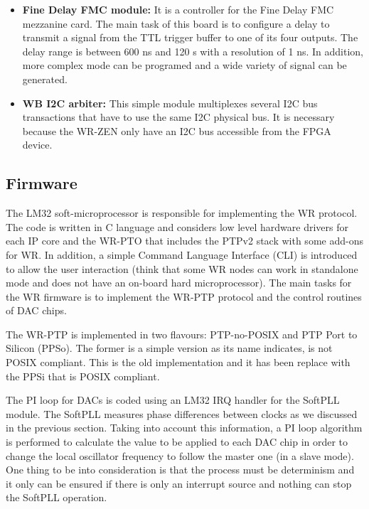 \documentclass[review]{elsarticle}
\newcommand{\klyonenote}[1]{\todo[bordercolor=red, backgroundcolor=yellow, noline]{#1}}
\begin{document}
\begin{itemize}
{	%
	}
	\item{\textbf{Fine Delay FMC module:} It is a controller for the Fine Delay FMC mezzanine card. The main task of this board is to configure a delay to transmit a signal from the TTL trigger buffer to one of its four outputs. The delay range is between 600 ns and 120 s with a resolution of 1 ns. In addition, more complex mode can be programed and a wide variety of signal can be generated.}
	\item{\textbf{WB I2C arbiter:} This simple module multiplexes several I2C bus transactions that have to use the same I2C physical bus. It is necessary because the WR-ZEN only have an I2C bus accessible from the FPGA device.}
\end{itemize}

\subsection{Firmware}

The LM32 soft-microprocessor is responsible for implementing the WR protocol. The code is written in C language and considers low level hardware drivers for each IP core and the WR-PTO that includes the PTPv2 stack with some add-ons for WR. In addition, a simple Command Language Interface (CLI) is introduced to allow the user interaction (think that some WR nodes can work in standalone mode and does not have an on-board hard microprocessor). The main tasks for the WR firmware is to implement the WR-PTP protocol and the control routines of DAC chips. 

\klyonenote{What more information can we add at this point?}
The WR-PTP is implemented in two flavours: PTP-no-POSIX and PTP Port to Silicon (PPSo). The former is a simple version as its name indicates, is not POSIX compliant. This is the old implementation and it has been replace with the PPSi that is POSIX compliant.

The PI loop for DACs is coded using an LM32 IRQ handler for the SoftPLL module. The SoftPLL measures phase differences between clocks as we discussed in the previous section. Taking into account this information, a PI loop algorithm is performed to calculate the value to be applied to each DAC chip in order to change the local oscillator frequency to follow the master one (in a slave mode). One thing to be into consideration is that the process must be determinism and it only can be ensured if there is only an interrupt source and nothing can stop the SoftPLL operation.
\end{document}
